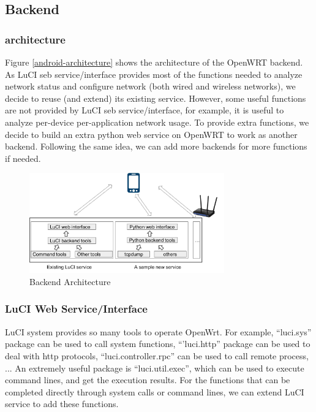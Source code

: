 \subsection{Backend}

\subsubsection{architecture}
Figure \ref{android-architecture} shows the architecture of the OpenWRT backend. As LuCI seb service/interface provides most of the functions needed to analyze network status and configure network (both wired and wireless networks), we decide to reuse (and extend) its existing service. However, some useful functions are not provided by LuCI seb service/interface, for example, it is useful to analyze per-device per-application network usage. To provide extra functions, we decide to build an extra python web service on OpenWRT to work as another backend. Following the same idea, we can add more backends for more functions if needed.

\begin{figure}
	\centering
	\includegraphics[width=0.75\textwidth]{backend-architecture.png}
	\caption{Backend Architecture}
	\label{backend-architecture}
\end{figure}

\subsubsection{LuCI Web Service/Interface}
LuCI system provides so many tools to operate OpenWrt. For example, ``luci.sys'' package can be used to call system functions, ``'luci.http'' package can be used to deal with http protocols, ``luci.controller.rpc'' can be used to call remote process, ... An extremely useful package is ``luci.util.exec'', which can be used to execute command lines, and get the execution results. For the functions that can be completed directly through system calls or command lines, we can extend LuCI service to add these functions.

